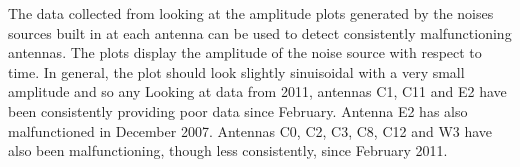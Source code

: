 \documentclass[a4paper,12pt]{article}
\begin{document}
                                                                                                                                                                                                                                                                                                                                                                                                                                                                                                                                                                                                                                                                                                                                                                                                                                                                                                                                                                                                                                                                                                                                                                                                                                                                                   The data collected from looking at the amplitude plots generated by the noises sources built in at each antenna can be used to detect consistently malfunctioning antennas. The plots display the amplitude of the noise source with respect to time. In general, the plot should look slightly sinuisoidal with a very small amplitude and so any Looking at data from 2011, antennas C1, C11 and E2 have been consistently providing poor data since February. Antenna E2 has also malfunctioned in December 2007. Antennas C0, C2, C3, C8, C12 and W3 have also been malfunctioning, though less consistently, since February 2011. 
\end{document}
